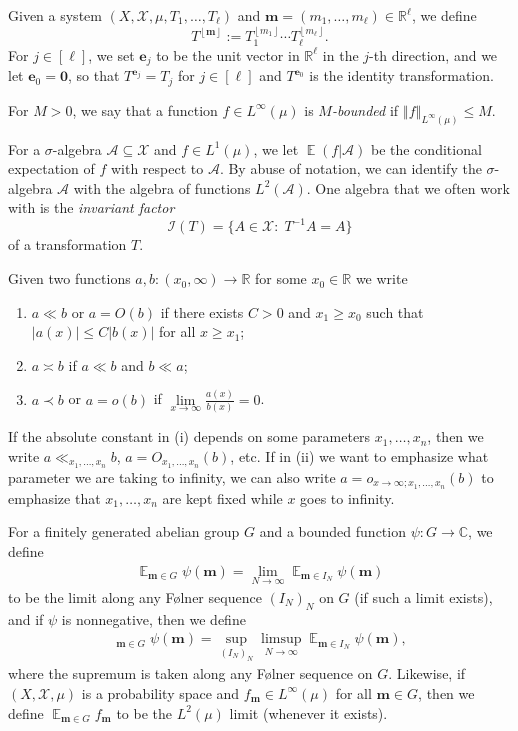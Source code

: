 \documentclass[11pt]{amsart}
\theoremstyle{definition}
\DeclareMathOperator*{\oE}{\overline{\mathbb{E}}}
\DeclareMathOperator*{\E}{\mathbb{E}}
\newcommand{\C}{{\mathbb C}}
\newcommand{\R}{{\mathbb R}}
\newcommand{\CA}{{\mathcal A}}
\newcommand{\CI}{{\mathcal I}}
\newcommand{\CX}{{\mathcal X}}
\newcommand{\bm}{{\mathbf{m}}}
\newcommand{\be}{{\mathbf{e}}}
\newcommand{\norm}[1]{\left\Vert #1\right\Vert}
\newcommand{\inv}{^{-1}}
\newcommand{\1}{{\mathbf{1}}}
\newcommand{\floor}[1]{{\left \lfloor #1 \right \rfloor}}
\begin{document}
Given a system $(X, \CX, \mu, T_1, \ldots, T_\ell)$ and $\bm=(m_{1},\dots,m_{\ell})\in\R^\ell$, we define $$T^{\floor{\bm}}:=T_1^{\floor{m_1}}\cdots T_\ell^{\floor{m_\ell}}.$$
For $j\in[\ell]$, we set $\be_j$ to be the unit vector in $\R^\ell$ in the $j$-th direction, and we let $\be_0 = \mathbf{0}$, so that $T^{\be_j} = T_j$ for $j\in[\ell]$ and $T^{\be_0}$ is the identity transformation. 

For $M>0$, we say that a function $f\in L^\infty(\mu)$ is \textit{$M$-bounded} if $\norm{f}_{L^\infty(\mu)}\leq M$.

For a $\sigma$-algebra $\CA\subseteq\CX$ and $f\in L^1(\mu)$, we let $\E(f|\CA)$ be the conditional expectation of $f$ with respect to $\CA$. By abuse of notation, we can identify the $\sigma$-algebra $\CA$ with the algebra of functions $L^2(\CA)$. One algebra that we often work with is the \textit{invariant factor}
$$\CI(T) = \{A\in \CX:\; T\inv A = A\}$$
of a transformation $T$.


Given two functions $a,b:(x_0,\infty)\to\mathbb{R}$ for some $x_0\in\R$ we write
\begin{enumerate}
    \item $a\ll b$ or $a = O(b)$ if there exists $C>0$ and $x_1\geq x_0$ such that $|a(x)| \leq C |b(x)|$ for all $x\geq x_1$; 
    \item $a \asymp b$ if $a\ll b$ and $b\ll a$;
    \item $a \prec b$ or $a = o(b)$  if $\lim\limits_{x\to\infty}\frac{a(x)}{b(x)} = 0$.
\end{enumerate}
If the absolute constant in (i) depends on some parameters $x_1, \ldots, x_n$, then we write $a\ll_{x_1, \ldots, x_n} b$, $a = O_{x_1, \ldots, x_n}(b)$, etc. If in (ii) we want to emphasize what parameter we are taking to infinity, we can also write $a = o_{x\to\infty; x_1, \ldots, x_n} (b)$ to emphasize that $x_1, \ldots, x_n$ are kept fixed while $x$ goes to infinity.





For a finitely generated abelian group $G$ and a bounded function $\psi:G\to\C$, we define
\begin{align*}
    \E_{\bm\in G}\psi(\bm) = \lim_{N\to\infty}\E_{\bm\in I_N}\psi(\bm)
\end{align*}
to be the limit along any F\o lner sequence $(I_N)_N$ on $G$ (if such a limit exists), and if $\psi$ is nonnegative, then we define
\begin{align*}
    \oE_{\bm\in G}\psi(\bm) = \sup_{(I_N)_N}\limsup_{N\to\infty}\E_{\bm\in I_N} \psi(\bm),
\end{align*}
where the supremum is taken along any F\o lner sequence on $G$. Likewise, if $(X,\CX,\mu)$ is a probability space and $f_\bm\in L^\infty(\mu)$ for all $\bm\in G$, then we define $\E_{\bm\in G}f_\bm$ to be the $L^2(\mu)$ limit (whenever it exists).
\end{document}

